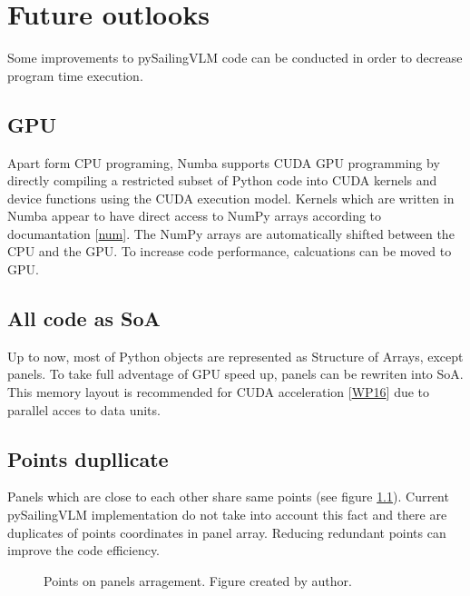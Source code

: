 \documentclass[letterpaper,10pt,english]{jupyterBook}
\let\sphinxpxdimen\pdfpxdimen\else\newdimen\sphinxpxdimen
\begin{document}
\sphinxstepscope


\chapter{Future outlooks}
\label{\detokenize{chapters/future:future-outlooks}}\label{\detokenize{chapters/future::doc}}
\sphinxAtStartPar
Some improvements to pySailingVLM code can be conducted in order to decrease program time execution.


\section{GPU}
\label{\detokenize{chapters/future:gpu}}
\sphinxAtStartPar
Apart form CPU programing, Numba supports CUDA GPU programming by directly compiling a restricted subset of Python code into CUDA kernels and device functions using the CUDA execution model. Kernels which are written in Numba appear to have direct access to NumPy arrays according to documantation {[}\hyperlink{cite.chapters/bibliography:id14}{num}{]}. The NumPy arrays are automatically shifted between the CPU and the GPU. To increase code performance, calcuations can be moved to GPU.


\section{All code as SoA}
\label{\detokenize{chapters/future:all-code-as-soa}}
\sphinxAtStartPar
Up to now, most of Python objects are represented as Structure of Arrays, except panels. To take full adventage of GPU speed up, panels can be rewriten into SoA. This memory layout is recommended for CUDA acceleration {[}\hyperlink{cite.chapters/bibliography:id13}{WP16}{]} due to parallel acces to data units.


\section{Points dupllicate}
\label{\detokenize{chapters/future:points-dupllicate}}
\sphinxAtStartPar
Panels which are close to each other share same points (see figure \hyperref[\detokenize{chapters/future:future-panels}]{\ref{\detokenize{chapters/future:future-panels}}}). Current pySailingVLM implementation do not take into account this fact and there are duplicates of points coordinates in panel array. Reducing redundant points can improve the code efficiency.

\begin{figure}[htbp]
\centering
\capstart

\noindent\sphinxincludegraphics[height=500\sphinxpxdimen]{{future_drawio}.png}
\caption{Points on panels arragement. Figure created by author.}\label{\detokenize{chapters/future:future-panels}}\end{figure}
\end{document}
